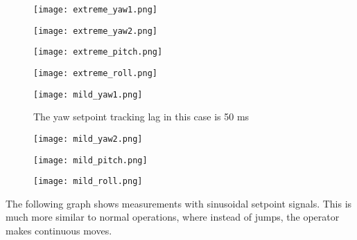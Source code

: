 \begin{figure}[h] \label{ fig7} \begin{minipage}[b]{0.50\linewidth}\centering\texttt{[image: extreme\_yaw1.png]} \caption{} \end{minipage} \begin{minipage}[b]{0.50\linewidth}\centering\texttt{[image: extreme\_yaw2.png]} \caption{} \end{minipage} \begin{minipage}[b]{0.50\linewidth}\centering\texttt{[image: extreme\_pitch.png]} \caption{} \end{minipage}\hfill \begin{minipage}[b]{0.50\linewidth}\centering\texttt{[image: extreme\_roll.png]} \caption{} \end{minipage} \end{figure}

\begin{figure}[h] \label{ fig7} \begin{minipage}[b]{0.50\linewidth}\centering\texttt{[image: mild\_yaw1.png]} \caption{The yaw setpoint tracking lag in this case is 50 ms} \end{minipage} \begin{minipage}[b]{0.50\linewidth}\centering\texttt{[image: mild\_yaw2.png]} \caption{} \end{minipage} \begin{minipage}[b]{0.50\linewidth}\centering\texttt{[image: mild\_pitch.png]} \caption{} \end{minipage}\hfill \begin{minipage}[b]{0.50\linewidth}\centering\texttt{[image: mild\_roll.png]} \caption{} \end{minipage} \end{figure}


The following graph shows measurements with sinusoidal setpoint signals. This is much more similar to normal operations, where instead of jumps, the operator makes continuous moves.

